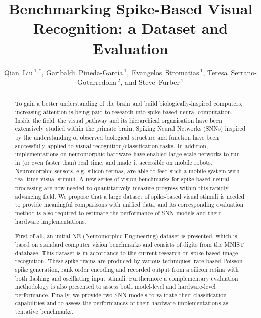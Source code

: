 \documentclass{frontiersENG} %
\def\firstAuthorLast{Qian Liu {et~al.}} %
\def\Authors{Qian~Liu\,$^{1,*}$, Garibaldi~Pineda-Garc\'ia\,$^{1}$, Evangelos~Stromatias\,$^{1}$, Teresa~Serrano-Gotarredona\,$^{2}$, and Steve~Furber\,$^{1}$}
\begin{document}
\onecolumn
{}

\title[Benchmarking Spike-Based Visual Recognition: a Dataset and Evaluation]{Benchmarking  Spike-Based Visual Recognition: a Dataset and Evaluation}
\author[\firstAuthorLast ]{\Authors}
\address{}
\correspondance{}
\extraAuth{}%
\topic{}

\maketitle
\begin{abstract}

To gain a better understanding of the brain and build biologically-inspired computers, increasing attention is being paid to research into spike-based neural computation.
Inside the field, the visual pathway and its hierarchical organisation have been extensively studied within the primate brain.
Spiking Neural Networks (SNNs) inspired by the understanding of observed biological structure and function have been successfully applied to visual recognition/classification tasks.
In addition, implementations on neuromorphic hardware have enabled large-scale networks to run in (or even faster than) real time, and made it accessible on mobile robots.
Neuromorphic sensors, e.g. silicon retinas, are able to feed such a mobile system with real-time visual stimuli.
A new series of vision benchmarks for spike-based neural processing are now needed to quantitatively measure progress within this rapidly advancing field.
We propose that a large dataset of spike-based visual stimuli is needed to provide meaningful comparisons with unified data, and its corresponding evaluation method is also required to estimate the performance of SNN models and their hardware implementations.

First of all, an initial NE (Neuromorphic Engineering) dataset is presented, which is based on standard computer vision benchmarks and consists of digits from the MNIST database. This dataset is in accordance to the current research on spike-based image recognition.
These spike trains are produced by various techniques: rate-based Poisson spike generation, rank order encoding and recorded output from a silicon retina with both flashing and oscillating input stimuli.
Furthermore a complementary evaluation methodology is also presented to assess both model-level and hardware-level performance.
Finally, we provide two SNN models to validate their classification capabilities and to assess the performances of their hardware implementations as tentative benchmarks.


\end{abstract}
\end{document}

